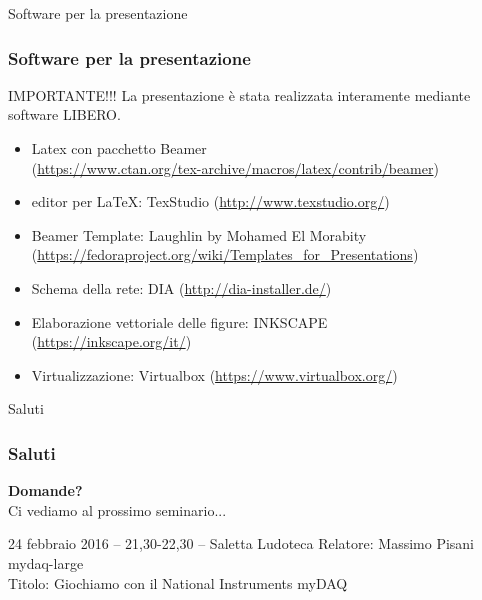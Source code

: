 \documentclass[11pt,xcolor=table]{beamer}
\begin{document}
\begin{frame}{Software per la presentazione}
	\frametitle{Software per la presentazione}
	\begin{block}{IMPORTANTE!!!}
		La presentazione è stata realizzata interamente mediante software LIBERO.
	\end{block}
	
	\begin{itemize}
		\item Latex con pacchetto Beamer\\ {\tiny (\url{https://www.ctan.org/tex-archive/macros/latex/contrib/beamer})}
		\item editor per LaTeX: TexStudio {\tiny (\url{http://www.texstudio.org/}) }
		\item Beamer Template: Laughlin by Mohamed El Morabity\\ {\tiny (\url{https://fedoraproject.org/wiki/Templates_for_Presentations})}
		\item Schema della rete: DIA {\tiny (\url{http://dia-installer.de/})}
		\item Elaborazione vettoriale delle figure: INKSCAPE\\ {\tiny (\url{https://inkscape.org/it/})}
		\item Virtualizzazione: Virtualbox {\tiny (\url{https://www.virtualbox.org/})}
	\end{itemize}
\end{frame}

\begin{frame}{Saluti}
	\frametitle{Saluti}
	\centering \textbf{\Large Domande?}\\
	\vspace{1cm}
	{Ci vediamo al prossimo seminario...}
	\begin{block}{24 febbraio 2016 – 21,30-22,30 – Saletta Ludoteca}
		Relatore: Massimo Pisani mydaq-large\\
		Titolo: Giochiamo con il National Instruments myDAQ
	\end{block}
\end{frame}
\end{document}
